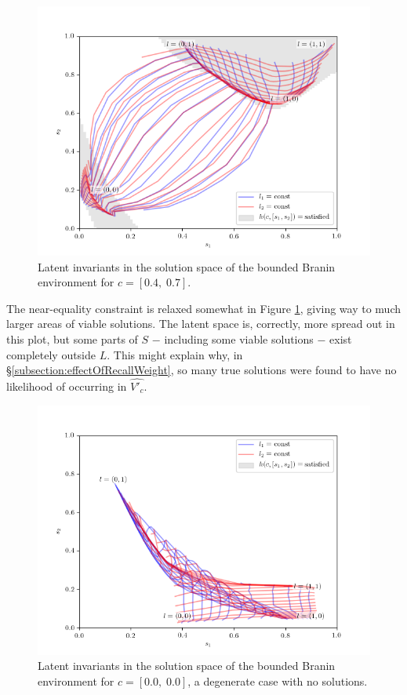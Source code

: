 \documentclass[../../main.tex]{subfiles}
\begin{document}
\begin{figure}[H]
    \begin{center}
    \includegraphics[width=\textwidth]{latentPlot0407}
    \caption{
        Latent invariants in the solution space of the bounded Branin environment for $c=[0.4,\;0.7]$.
    }
    \label{fig:latentPlot0407}
    \end{center}
\end{figure}
The near-equality constraint is relaxed somewhat in Figure \ref{fig:latentPlot0407}, giving way to much larger areas of viable solutions.
The latent space is, correctly, more spread out in this plot, but some parts of $S$ $-$ including some viable solutions $-$ exist completely outside $L$.
This might explain why, in \S\ref{subsection:effectOfRecallWeight}, so many true solutions were found to have no likelihood of occurring in $\hat{V'_c}$.
\begin{figure}[H]
    \begin{center}
    \includegraphics[width=\textwidth]{latentPlot0000}
    \caption{
        Latent invariants in the solution space of the bounded Branin environment for $c=[0.0,\;0.0]$, a degenerate case with no solutions.
    }
    \label{fig:latentPlot0000}
    \end{center}
\end{figure}
\end{document}
